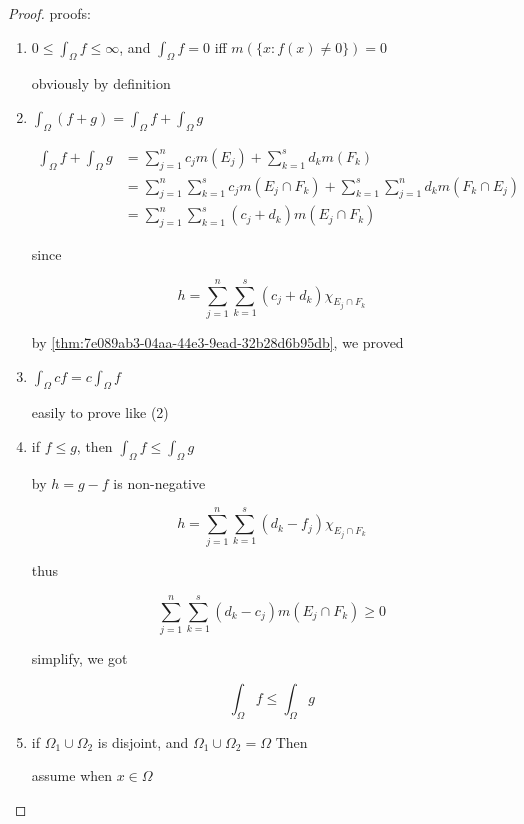 \begin{proof}
    proofs:

    \begin{enumerate}
        \item $0 \le \int_{\Omega}f \le \infty$, and $\int_{\Omega}f = 0$ iff $m(\{ x: f(x) \ne 0\}) = 0$

        obviously by definition

        \item $\int_{\Omega}(f+g) = \int_{\Omega}f  + \int_{\Omega}g $

        \begin{align*}
            \int_{\Omega}f  + \int_{\Omega}g  &= \sum_{j=1}^{n}c_j m(E_j) + \sum_{k=1}^{s}d_k m(F_k) \\
            &= \sum_{j=1}^{n}\sum_{k=1}^{s}c_j m(E_j \cap F_k) + \sum_{k=1}^{s}\sum_{j=1}^{n}d_k m(F_k \cap E_j) \\
            &= \sum_{j=1}^{n}\sum_{k=1}^{s}\left(c_j + d_k \right) m(E_j \cap F_k)
        \end{align*}

        since 

        \[
            h = \sum_{j=1}^{n}\sum_{k=1}^{s}\left(c_j + d_k \right)\chi_{E_j \cap F_k}
        \]

        by \autoref{thm:7e089ab3-04aa-44e3-9ead-32b28d6b95db}, we proved

        \item $\int_{\Omega}cf = c\int_{\Omega}f$

        easily to prove like (2)

        \item if $ f \le g$, then $\int_{\Omega}f \le \int_{\Omega}g$

        by $h = g -f$ is non-negative

        \[
            h = \sum_{j=1}^{n}\sum_{k=1}^{s}\left(d_k -f_j\right)\chi_{E_j \cap F_k}
        \]

        thus

        \[
            \sum_{j=1}^{n}\sum_{k=1}^{s}\left(d_k - c_j \right) m(E_j \cap F_k) \ge 0
        \]

        simplify, we got

        \[
            \int_{\Omega}f \le \int_{\Omega}g
        \]

        \item if $\Omega_1 \cup \Omega_2$ is disjoint, and $\Omega_1 \cup \Omega_2 = \Omega$ Then

        assume when $x \in \Omega$


\end{enumerate}
\end{proof}
